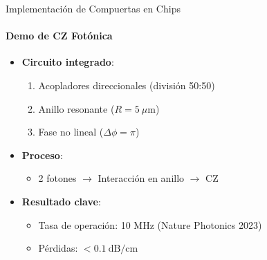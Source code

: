 \documentclass{beamer}
\begin{document}
\begin{frame}{Implementación de Compuertas en Chips}
\framesubtitle{Demo de CZ Fotónica}

\begin{itemize}
    \item \textbf{Circuito integrado}:
    \begin{enumerate}
        \item Acopladores direccionales (división 50:50)
        \item Anillo resonante (\(R = 5\ \mu\text{m}\))
        \item Fase no lineal (\(\Delta\phi = \pi\))
    \end{enumerate}
    
    \item \textbf{Proceso}:
    \begin{itemize}
        \item 2 fotones \(\rightarrow\) Interacción en anillo \(\rightarrow\) CZ
    \end{itemize}
    
    \item \textbf{Resultado clave}:
    \begin{itemize}
        \item Tasa de operación: 10 MHz (Nature Photonics 2023)
        \item Pérdidas: \(<0.1\ \text{dB/cm}\)
    \end{itemize}
\end{itemize}
\end{frame}
\end{document}
